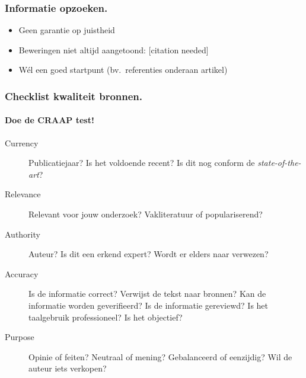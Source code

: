 \documentclass[aspectratio=169]{beamer}
\begin{document}
\begin{frame}
  \frametitle{Informatie opzoeken.}


  {\pause}

  \begin{itemize}
    \item Geen garantie op juistheid
    \item Beweringen niet altijd aangetoond: [citation needed]
    \item \alert{Wél} een goed startpunt (bv.\ referenties onderaan artikel)
  \end{itemize}
\end{frame}

\begin{frame}
  \frametitle{Checklist kwaliteit bronnen.}
  \framesubtitle{Doe de CRAAP test!}

  \begin{description}
    \item[Currency] Publicatiejaar? Is het voldoende recent? Is dit nog conform de \emph{state-of-the-art}?
    \item[Relevance] Relevant voor jouw onderzoek? Vakliteratuur of populariserend?
    \item[Authority] Auteur? Is dit een erkend expert? Wordt er elders naar verwezen?
    \item[Accuracy] Is de informatie correct? Verwijst de tekst naar bronnen? Kan de informatie worden geverifieerd? Is de informatie gereviewd? Is het taalgebruik professioneel? Is het objectief?
    \item[Purpose] Opinie of feiten? Neutraal of mening? Gebalanceerd of eenzijdig? Wil de auteur iets verkopen?
  \end{description}

\end{frame}
\end{document}
